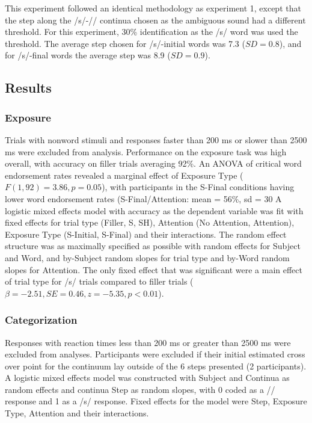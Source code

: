 This experiment followed an identical methodology as experiment 1, except that the step along the /s/-/\textesh/ continua chosen as the ambiguous sound had a different threshold.  For this experiment, 30\% identification as the /s/ word was used the threshold. The average step chosen for /s/-initial words was 7.3 ($SD = 0.8$), and for /s/-final words the average step was 8.9 ($SD = 0.9$).

\subsection{Results}

\subsubsection{Exposure}

Trials with nonword stimuli and responses faster than 200 ms or slower than 2500 ms were excluded from analysis. 
Performance on the exposure task was high overall, with accuracy on filler trials averaging 92\%.  
An ANOVA of critical word endorsement rates revealed a marginal effect of Exposure Type ($F(1,92) = 3.86, p = 0.05$), with participants in the S-Final conditions having lower word endorsement rates (S-Final/Attention: mean = 56\%, sd = 30%
A logistic mixed effects model with accuracy as the dependent variable was fit with fixed effects for trial type (Filler, S, SH), Attention (No Attention, Attention), Exposure Type (S-Initial, S-Final) and their interactions. 
The random effect structure was as maximally specified as possible with random effects for Subject and Word, and by-Subject random slopes for trial type and by-Word random slopes for Attention. 
The only fixed effect that was significant were a main effect of trial type for /s/ trials compared to filler trials ($\beta = -2.51, SE = 0.46, z = -5.35, p < 0.01$).

\subsubsection{Categorization}

Responses with reaction times less than 200 ms or greater than 2500 ms were excluded from analyses. 
Participants were excluded if their initial estimated cross over point for the continuum lay outside of the 6 steps presented (2 participants).  
A logistic mixed effects model was constructed with Subject and Continua as random effects and continua Step as random slopes, with 0 coded as a /\textesh/ response and 1 as a /s/ response.  Fixed effects for the model were Step, Exposure Type, Attention and their interactions.

